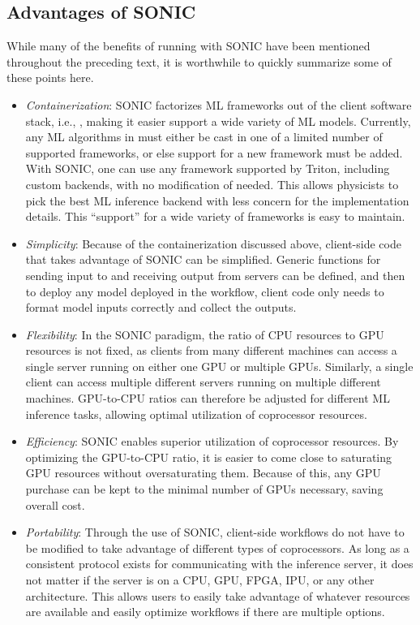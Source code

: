 \subsection{Advantages of SONIC}
\label{sec:sonic_benefits}
While many of the benefits of running with SONIC have been mentioned throughout the preceding text, it is worthwhile to quickly summarize some of these points here.
\begin{itemize}
    \item \emph{Containerization}: SONIC factorizes ML frameworks out of the client software stack, i.e., \CMSSW, making it easier support a wide variety of ML models. Currently, any ML algorithms in \CMSSW must either be cast in one of a limited number of supported frameworks, or else support for a new framework must be added. With SONIC, one can use any framework supported by Triton, including custom backends, with no modification of \CMSSW needed. This allows physicists to pick the best ML inference backend with less concern for the implementation details. This ``support'' for a wide variety of frameworks is easy to maintain.
    \item \emph{Simplicity}: Because of the containerization discussed above, client-side code that takes advantage of SONIC can be simplified. Generic functions for sending input to and receiving output from servers can be defined, and then to deploy any model deployed in the workflow, client code only needs to format model inputs correctly and collect the outputs.
    \item \emph{Flexibility}: In the SONIC paradigm, the ratio of CPU resources to GPU resources is not fixed, as clients from many different machines can access a single server running on either one GPU or multiple GPUs. Similarly, a single client can access multiple different servers running on multiple different machines. GPU-to-CPU ratios can therefore be adjusted for different ML inference tasks, allowing optimal utilization of coprocessor resources.
    \item \emph{Efficiency}: SONIC enables superior utilization of coprocessor resources. By optimizing the GPU-to-CPU ratio, it is easier to come close to saturating GPU resources without oversaturating them. Because of this, any GPU purchase can be kept to the minimal number of GPUs necessary, saving overall cost.
    \item \emph{Portability}: Through the use of SONIC, client-side workflows do not have to be modified to take advantage of different types of coprocessors. As long as a consistent protocol exists for communicating with the inference server, it does not matter if the server is on a CPU, GPU, FPGA, IPU, or any other architecture. This allows users to easily take advantage of whatever resources are available and easily optimize workflows if there are multiple options.

\end{itemize}
